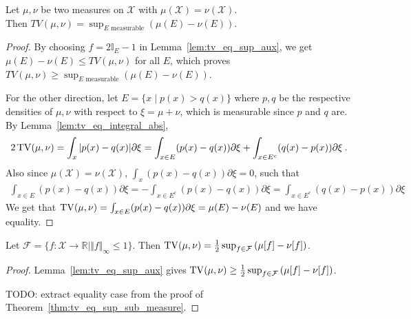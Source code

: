 \begin{theorem}
  \label{thm:tv_eq_sup_sub_measure}
  Let $\mu, \nu$ be two measures on $\mathcal X$ with $\mu(\mathcal X) = \nu(\mathcal X)$.\\
  Then $TV(\mu, \nu) = \sup_{E \text{ measurable}} \left( \mu(E) - \nu(E) \right)$.
\end{theorem}

\begin{proof}
By choosing $f = 2 \mathbb{I}_E - 1$ in Lemma~\ref{lem:tv_eq_sup_aux}, we get $\mu(E) - \nu(E) \le TV(\mu, \nu)$ for all $E$, which proves
$TV(\mu, \nu) \ge \sup_{E \text{ measurable}} \left( \mu(E) - \nu(E) \right)$.

For the other direction, let $E = \{x \mid p(x) > q(x)\}$ where $p,q$ be the respective densities of $\mu, \nu$ with respect to $\xi=\mu+\nu$, which is measurable since $p$ and $q$ are. By Lemma~\ref{lem:tv_eq_integral_abs},
\begin{align*}
2\operatorname{TV}(\mu, \nu)
= \int_x \vert p(x) - q(x) \vert \partial \xi
= \int_{x \in E} (p(x) - q(x)) \partial \xi + \int_{x \in E^c} (q(x) - p(x)) \partial \xi
\: .
\end{align*}
Also since $\mu(\mathcal X) = \nu(\mathcal X)$, $\int_x (p(x) - q(x)) \partial \xi = 0$, such that
\begin{align*}
\int_{x \in E} (p(x) - q(x)) \partial \xi
= - \int_{x \in E^c} (p(x) - q(x)) \partial \xi
= \int_{x \in E^c} (q(x) - p(x)) \partial \xi
\end{align*}
We get that $\operatorname{TV}(\mu, \nu) = \int_{x \in E} (p(x) - q(x)) \partial \xi = \mu(E) - \nu(E)$ and we have equality.
\end{proof}

\begin{theorem}
  \label{thm:tv_eq_sup_sub_integral}
  Let $\mathcal F = \{f : \mathcal X \to \mathbb{R} \mid \Vert f \Vert_\infty \le 1\}$.
  Then $\operatorname{TV}(\mu, \nu) = \frac{1}{2} \sup_{f \in \mathcal F} \left( \mu[f] - \nu[f] \right)$.
\end{theorem}

\begin{proof}
Lemma~\ref{lem:tv_eq_sup_aux} gives $\operatorname{TV}(\mu, \nu) \ge \frac{1}{2} \sup_{f \in \mathcal F} \left( \mu[f] - \nu[f] \right)$.

TODO: extract equality case from the proof of Theorem~\ref{thm:tv_eq_sup_sub_measure}.
\end{proof}

